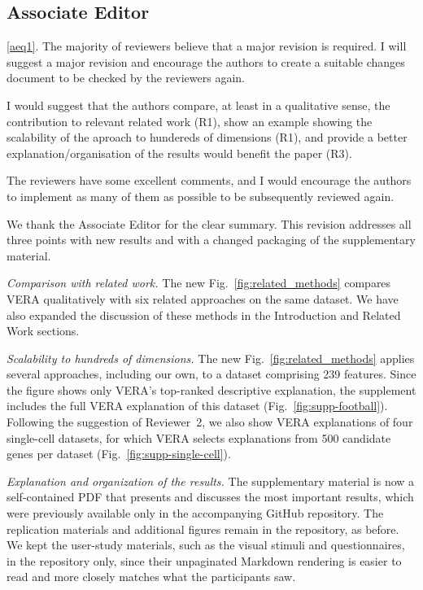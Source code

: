 \documentclass[11pt]{article}
\newcounter{rtaskno}
\newcommand{\rtask}[1]{\refstepcounter{rtaskno}\label{#1}}
\newcommand{\reviewc}[2]{\begin{leftbar}\noindent\rtask{#1}\ref{#1}. #2\end{leftbar}\vspace*{-4mm}}
\newcommand{\answer}[1]{\noindent #1\par\vspace{2mm}}
\newlength{\leftbarwidth}
\newlength{\leftbarsep}
\renewenvironment{leftbar}{%
    \def\FrameCommand{{\color{black}{\vrule width \leftbarwidth\relax\hspace {\leftbarsep}}}}%
    \MakeFramed {\advance \hsize -\width \FrameRestore }%
}{\endMakeFramed}
\begin{document}
\subsection*{Associate Editor}

\reviewc{aeq1}{The majority of reviewers believe that a major revision is required. I will suggest a major revision and encourage the authors to create a suitable changes document to be checked by the reviewers again.

I would suggest that the authors compare, at least in a qualitative sense, the contribution to relevant related work (R1), show an example showing the scalability of the aproach to hundereds of dimensions (R1), and provide a better explanation/organisation of the results would benefit the paper (R3).

The reviewers have some excellent comments, and I would encourage the authors to implement as many of them as possible to be subsequently reviewed again.}

\answer{We thank the Associate Editor for the clear summary. This revision addresses all three points with new results and with a changed packaging of the supplementary material.

\emph{Comparison with related work.} The new Fig.~\ref{fig:related_methods} compares VERA qualitatively with six related approaches on the same dataset. We have also expanded the discussion of these methods in the Introduction and Related Work sections.

\emph{Scalability to hundreds of dimensions.} The new Fig.~\ref{fig:related_methods} applies several approaches, including our own, to a dataset comprising 239 features.
Since the figure shows only VERA's top-ranked descriptive explanation, the supplement includes the full VERA explanation of this dataset (Fig.~\ref{fig:supp-football}).
Following the suggestion of Reviewer~2, we also show VERA explanations of four single-cell datasets, for which VERA selects explanations from 500 candidate genes per dataset (Fig.~\ref{fig:supp-single-cell}).

\emph{Explanation and organization of the results.} The supplementary material is now a self-contained PDF that presents and discusses the most important results, which were previously available only in the accompanying GitHub repository. The replication materials and additional figures remain in the repository, as before. We kept the user-study materials, such as the visual stimuli and questionnaires, in the repository only, since their unpaginated Markdown rendering is easier to read and more closely matches what the participants saw.}
\end{document}
